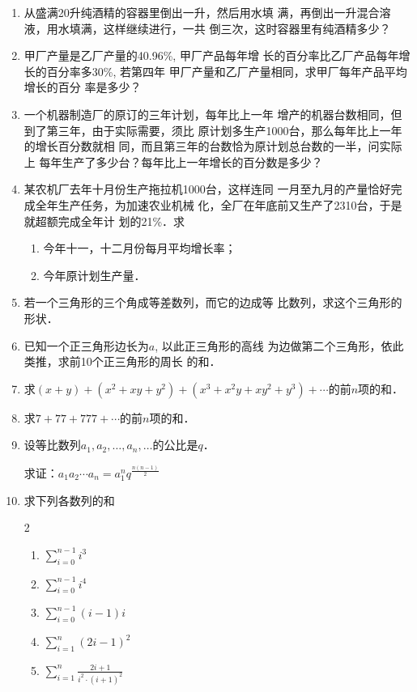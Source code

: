 \begin{enumerate}
\item 从盛满20升纯酒精的容器里倒出一升，然后用水填
满，再倒出一升混合溶液，用水填满，这样继续进行，一共
倒三次，这时容器里有纯酒精多少？
\item 甲厂产量是乙厂产量的40.96\%, 甲厂产品每年增
长的百分率比乙厂产品每年增长的百分率多30\%, 若第四年
甲厂产量和乙厂产量相同，求甲厂每年产品平均增长的百分
率是多少？
\item 一个机器制造厂的原订的三年计划，每年比上一年
增产的机器台数相同，但到了第三年，由于实际需要，须比
原计划多生产1000台，那么每年比上一年的增长百分数就相
同，而且第三年的台数恰为原计划总台数的一半，问实际上
每年生产了多少台？每年比上一年增长的百分数是多少？

\item 某农机厂去年十月份生产拖拉机1000台，这样连同
一月至九月的产量恰好完成全年生产任务，为加速农业机械
化，全厂在年底前又生产了2310台，于是就超额完成全年计
划的21\%．求
\begin{enumerate}
    \item 今年十一，十二月份每月平均增长率；
    \item 今年原计划生产量．
\end{enumerate}

\item 若一个三角形的三个角成等差数列，而它的边成等
比数列，求这个三角形的形状．
\item 已知一个正三角形边长为$a$, 以此正三角形的高线
为边做第二个三角形，依此类推，求前10个正三角形的周长
的和．
\item 求$(x+y)+(x^2+xy+y^2)+(x^3+x^2y+xy^2+y^3)+\cdots$的前$n$项的和．
\item 求$7+77+777+\cdots$的前$n$项的和．

\item 设等比数列$a_1,a_2,\ldots,a_n,\ldots$的公比是$q$．

求证：$a_1a_2\cdots a_n=a^n_1q^{\tfrac{n(n-1)}{2}}$

\item 求下列各数列的和
\begin{multicols}{2}
\begin{enumerate}
    \item $\displaystyle \sum^{n-1}_{i=0} i^3$
    \item $\displaystyle \sum^{n-1}_{i=0} i^4$
    \item $\displaystyle \sum^{n-1}_{i=0} (i-1)i$
    \item $\displaystyle \sum^{n}_{i=1} (2i-1)^2$
    \item $\displaystyle \sum^{n}_{i=1} \frac{2i+1}{i^2\cdot (i+1)^2}$
\end{enumerate}
\end{multicols}


\end{enumerate}
